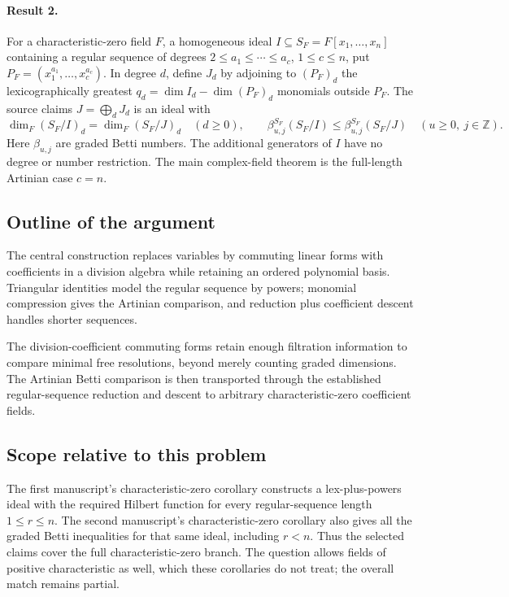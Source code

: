 \documentclass[11pt]{article}
\begin{document}
\paragraph{Result 2.} For a characteristic-zero field \(F\), a homogeneous ideal \(I\subseteq S_F=F[x_1,\ldots,x_n]\) containing a regular sequence of degrees \(2\le a_1\le\cdots\le a_c\), \(1\le c\le n\), put \(P_F=(x_1^{a_1},\ldots,x_c^{a_c})\). In degree \(d\), define \(J_d\) by adjoining to \((P_F)_d\) the lexicographically greatest \(q_d=\dim I_d-\dim(P_F)_d\) monomials outside \(P_F\). The source claims \(J=\bigoplus_dJ_d\) is an ideal with
\[
 \dim_F(S_F/I)_d=\dim_F(S_F/J)_d\quad(d\ge0),\qquad
 \beta^{S_F}_{u,j}(S_F/I)\le\beta^{S_F}_{u,j}(S_F/J)
 \quad(u\ge0,\ j\in\mathbb Z).
\]
Here \(\beta_{u,j}\) are graded Betti numbers. The additional generators of \(I\) have no degree or number restriction. The main complex-field theorem is the full-length Artinian case \(c=n\).

\subsection{Outline of the argument}
The central construction replaces variables by commuting linear forms with coefficients in a division algebra while retaining an ordered polynomial basis. Triangular identities model the regular sequence by powers; monomial compression gives the Artinian comparison, and reduction plus coefficient descent handles shorter sequences.

The division-coefficient commuting forms retain enough filtration information to compare minimal free resolutions, beyond merely counting graded dimensions. The Artinian Betti comparison is then transported through the established regular-sequence reduction and descent to arbitrary characteristic-zero coefficient fields.

\subsection{Scope relative to this problem}
The first manuscript's characteristic-zero corollary constructs a lex-plus-powers ideal with the required Hilbert function for every regular-sequence length $1\le r\le n$. The second manuscript's characteristic-zero corollary also gives all the graded Betti inequalities for that same ideal, including $r<n$. Thus the selected claims cover the full characteristic-zero branch. The question allows fields of positive characteristic as well, which these corollaries do not treat; the overall match remains partial.
\end{document}

